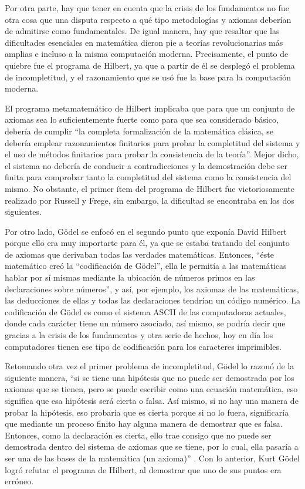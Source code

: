 \documentclass[letterpaper, 12 pt, conference]{ieeeconf}  %
\begin{document}
\begin{.}
Por otra parte, hay que tener en cuenta que la crisis de los fundamentos no fue otra cosa que una disputa respecto a qué tipo metodologías y axiomas deberían de admitirse como fundamentales. De igual manera, hay que resaltar que las dificultades esenciales en matemática dieron pie a teorías revolucionarias más amplias e incluso a la misma computación moderna. Precisamente, el punto de quiebre fue el programa de Hilbert, ya que a partir de él se desplegó el problema de incompletitud, y el razonamiento que se usó fue la base para la computación moderna. 

El programa metamatemático de Hilbert implicaba que para que un conjunto de axiomas sea lo suficientemente fuerte como para que sea considerado básico, debería de cumplir “la completa formalización de la matemática clásica, se debería emplear razonamientos finitarios para probar la completitud del sistema y el uso de métodos finitarios para probar la consistencia de la teoría”\cite{c12}. Mejor dicho, el sistema no debería de conducir a contradicciones y la demostración debe ser finita para comprobar tanto la completitud del sistema como la consistencia del mismo. No obstante, el primer ítem del programa de Hilbert fue victoriosamente realizado por Russell y Frege, sin embargo, la dificultad se encontraba en los dos siguientes. 

Por otro lado, Gödel se enfocó en el segundo punto que exponía David Hilbert porque ello era muy importarte para él, ya que se estaba tratando del conjunto de axiomas que derivaban todas las verdades matemáticas. Entonces, “éste matemático creó la “codificación de Gödel”, ella le permitía a las matemáticas hablar por sí mismas mediante la ubicación de números primos en las declaraciones sobre números”\cite{c7}, y así, por ejemplo, los axiomas de las matemáticas, las deducciones de ellas y todas las declaraciones tendrían un código numérico. La codificación de Gödel es como el sistema ASCII de las computadoras actuales, donde cada carácter tiene un número asociado, así mismo, se podría decir que gracias a la crisis de los fundamentos y otra serie de hechos, hoy en día los computadores tienen ese tipo de codificación para los caracteres imprimibles.

Retomando otra vez el primer problema de incompletitud, Gödel lo razonó de la siguiente manera, “si se tiene una hipótesis que no puede ser demostrada por los axiomas que se tienen, pero se puede escribir como una ecuación matemática, eso significa que esa hipótesis será cierta o falsa. Así mismo, si no hay una manera de probar la hipótesis, eso probaría que es cierta porque si no lo fuera, significaría que mediante un proceso finito hay alguna manera de demostrar que es falsa. Entonces, como la declaración es cierta, ello trae consigo que no puede ser demostrada dentro del sistema de axiomas que se tiene, por lo cual, ella pasaría a ser una de las bases de la matemática (un axioma)” \cite{c7}. Con lo anterior, Kurt Gödel logró refutar el programa de Hilbert, al demostrar que uno de sus puntos era erróneo. 


\end{.}
\end{document}
